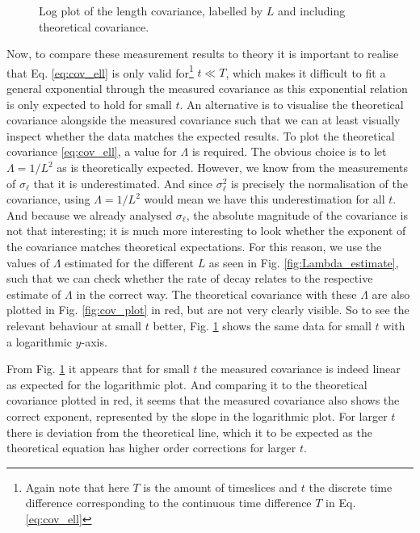 \begin{figure}[ht]
\begin{minipage}[t]{0.49\linewidth}
        \caption{Log plot of the length covariance, labelled by $L$ and including theoretical covariance.}
        \label{fig:cov_log_plot}
    \end{minipage}
\end{figure}

Now, to compare these measurement results to theory it is important to realise that Eq. \eqref{eq:cov_ell} is only valid for\footnote{Again note that here $T$ is the amount of timeslices and $t$ the discrete time difference corresponding to the continuous time difference $T$ in Eq. \eqref{eq:cov_ell}} $t \ll T$, which makes it difficult to fit a general exponential through the measured covariance as this exponential relation is only expected to hold for small $t$.
An alternative is to visualise the theoretical covariance alongside the measured covariance such that we can at least visually inspect whether the data matches the expected results.
To plot the theoretical covariance \eqref{eq:cov_ell}, a value for $\Lambda$ is required.
The obvious choice is to let $\Lambda = 1/L^2$ as is theoretically expected.
However, we know from the measurements of $\sigma_\ell$ that it is underestimated. And since $\sigma_\ell^2$ is precisely the normalisation of the covariance, using $\Lambda = 1/L^2$ would mean we have this underestimation for all $t$.
And because we already analysed $\sigma_\ell$, the absolute magnitude of the covariance is not that interesting; it is much more interesting to look whether the exponent of the covariance matches theoretical expectations.
For this reason, we use the values of $\Lambda$ estimated for the different $L$ as seen in Fig. \ref{fig:Lambda_estimate}, such that we can check whether the rate of decay relates to the respective estimate of $\Lambda$ in the correct way.
The theoretical covariance with these $\Lambda$ are also plotted in Fig. \ref{fig:cov_plot} in red, but are not very clearly visible.
So to see the relevant behaviour at small $t$ better, Fig. \ref{fig:cov_log_plot} shows the same data for small $t$ with a logarithmic $y$-axis.

From Fig. \ref{fig:cov_log_plot} it appears that for small $t$ the measured covariance is indeed linear as expected for the logarithmic plot. And comparing it to the theoretical covariance plotted in red, it seems that the measured covariance also shows the correct exponent, represented by the slope in the logarithmic plot.
For larger $t$ there is deviation from the theoretical line, which it to be expected as the theoretical equation has higher order corrections for larger $t$.

